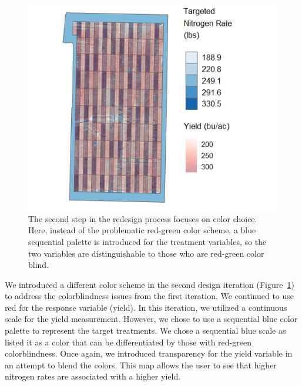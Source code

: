 \documentclass[
  authoryear,
  preprint,
  3p]{elsarticle}
\begin{document}
\begin{figure}

{\centering \includegraphics{../images/paper/Attempt2.png}

}

\caption{\label{fig-redesign2}The second step in the redesign process
focuses on color choice. Here, instead of the problematic red-green
color scheme, a blue sequential palette is introduced for the treatment
variables, so the two variables are distinguishable to those who are
red-green color blind.}

\end{figure}

We introduced a different color scheme in the second design iteration
(Figure~\ref{fig-redesign2}) to address the colorblindness issues from
the first iteration. We continued to use red for the response variable
(yield). In this iteration, we utilized a continuous scale for the yield
measurement. However, we chose to use a sequential blue color palette to
represent the target treatments. We chose a sequential blue scale as
\citet{wong2011color} listed it as a color that can be differentiated by
those with red-green colorblindness. Once again, we introduced
transparency for the yield variable in an attempt to blend the colors.
This map allows the user to see that higher nitrogen rates are
associated with a higher yield.
\end{document}

